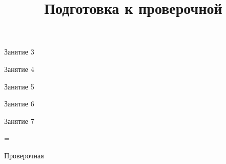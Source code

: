 \begin{class}[number=3]
	\begin{listofex}
		\item Занятие 3 
	\end{listofex}
\end{class}

\begin{class}[number=4]
	\begin{listofex}
		\item Занятие 4
	\end{listofex}
\end{class}

\begin{class}[number=5]
	\begin{listofex}
		\item Занятие 5
	\end{listofex}
\end{class}

\begin{class}[number=6]
	\begin{listofex}
		\item Занятие 6
	\end{listofex}
\end{class}

\begin{class}[number=7]
	\title{Подготовка к проверочной}
	\begin{listofex}
		\item Занятие 7
	\end{listofex}
\end{class}

=%
\begin{exam}
	\begin{listofex}
		\item Проверочная
	\end{listofex}
\end{exam}
